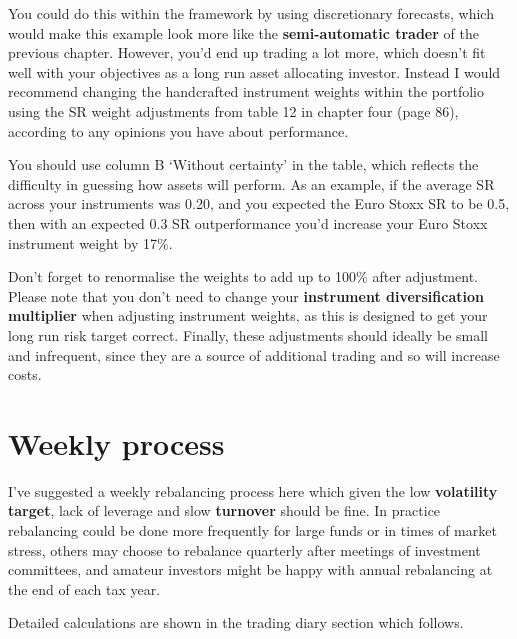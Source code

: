You could do this within the framework by using discretionary forecasts, which would make this example look more like the \textbf{semi-automatic trader} of the previous chapter. However, you'd end up trading a lot more, which doesn't fit well with your objectives as a long run asset allocating investor. Instead I would recommend changing the handcrafted instrument weights within the portfolio using the SR weight adjustments from table 12 in chapter four (page 86), according to any opinions you have about performance.

You should use column B ‘Without certainty' in the table, which reflects the difficulty in guessing how assets will perform. As an example, if the average SR across your instruments was 0.20, and you expected the Euro Stoxx SR to be 0.5, then with an expected 0.3 SR outperformance you'd increase your Euro Stoxx instrument weight by 17\%.

Don't forget to renormalise the weights to add up to 100\% after adjustment. Please note that you don't need to change your \textbf{instrument diversification multiplier} when adjusting instrument weights, as this is designed to get your long run risk target correct. Finally, these adjustments should ideally be small and infrequent, since they are a source of additional trading and so will increase costs.

\section*{Weekly process}  {}

I've suggested a weekly rebalancing process here which given the low \textbf{volatility target}, lack of leverage and slow \textbf{turnover} should be fine. In practice rebalancing could be done more frequently for large funds or in times of market stress, others may choose to rebalance quarterly after meetings of investment committees, and amateur investors might be happy with annual rebalancing at the end of each tax year.

Detailed calculations are shown in the trading diary section which follows.

